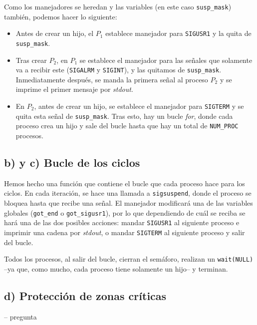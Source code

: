\documentclass{article}
\begin{document}
Como los manejadores se heredan y las variables (en este caso \texttt{susp\_mask}) también, podemos hacer lo siguiente:


\begin{itemize}
    \item Antes de crear un hijo, el $P_1$ establece manejador para \texttt{SIGUSR1} y la quita de \texttt{susp\_mask}.

    \item Tras crear $P_2$, en $P_1$ se establece el manejador para las señales que solamente va a recibir este (\texttt{SIGALRM} y \texttt{SIGINT}), y las quitamos de \texttt{susp\_mask}. Inmediatamente después, se manda la primera señal al proceso $P_2$ y se imprime el primer mensaje por \textit{stdout}.
    
    \item En $P_2$, antes de crear un hijo, se establece el manejador para \texttt{SIGTERM} y se quita esta señal de \texttt{susp\_mask}. Tras esto, hay un bucle \textit{for}, donde cada proceso crea un hijo y sale del bucle hasta que hay un total de \texttt{NUM\_PROC} procesos.

\end{itemize}

\subsection*{b) y c) Bucle de los ciclos}

Hemos hecho una función que contiene el bucle que cada proceso hace para los ciclos. En cada iteración, se hace una llamada a \texttt{sigsuspend}, donde el proceso se bloquea hasta que recibe una señal. El manejador modificará una de las variables globales (\texttt{got\_end} o \texttt{got\_sigusr1}), por lo que dependiendo de cuál se reciba se hará una de las dos posibles acciones: mandar \texttt{SIGUSR1} al siguiente proceso e imprimir una cadena por \textit{stdout}, o mandar \texttt{SIGTERM} al siguiente proceso y salir del bucle.

Todos los procesos, al salir del bucle, cierran el semáforo, realizan un \texttt{wait(NULL)} --ya que, como mucho, cada proceso tiene solamente un hijo-- y terminan.

\subsection*{d) Protección de zonas críticas} -- pregunta
\end{document}
